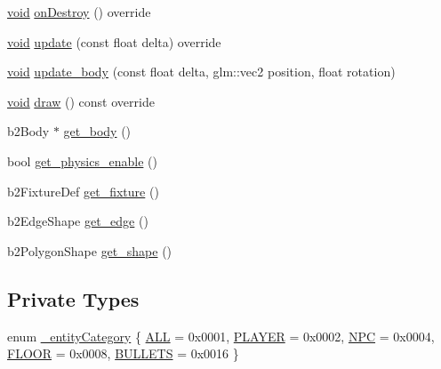 \begin{DoxyCompactItemize}
\hyperlink{imgui__impl__opengl3__loader_8h_ac668e7cffd9e2e9cfee428b9b2f34fa7}{void} \hyperlink{classPhysicsComponent_a5a5e472f0c6975d4a22e0990c504ec0a}{on\+Destroy} () override
\item 
\hyperlink{imgui__impl__opengl3__loader_8h_ac668e7cffd9e2e9cfee428b9b2f34fa7}{void} \hyperlink{classPhysicsComponent_a7494b2fec675132ee3e31050d7d87d30}{update} (const float delta) override
\item 
\hyperlink{imgui__impl__opengl3__loader_8h_ac668e7cffd9e2e9cfee428b9b2f34fa7}{void} \hyperlink{classPhysicsComponent_abbbd38f9a42a3fa09d42535b389e5b41}{update\+\_\+body} (const float delta, glm\+::vec2 position, float rotation)
\item 
\hyperlink{imgui__impl__opengl3__loader_8h_ac668e7cffd9e2e9cfee428b9b2f34fa7}{void} \hyperlink{classPhysicsComponent_afe1f99cac34411e9de43abebfcef0713}{draw} () const override
\item 
b2\+Body $\ast$ \hyperlink{classPhysicsComponent_af8a05389feadfe76f83ae492f20d4644}{get\+\_\+body} ()
\item 
bool \hyperlink{classPhysicsComponent_a54c20910dbe35ec46aa3e214f4503a89}{get\+\_\+physics\+\_\+enable} ()
\item 
b2\+Fixture\+Def \hyperlink{classPhysicsComponent_a63f0b8f93b3963c2225a7a75b63e4239}{get\+\_\+fixture} ()
\item 
b2\+Edge\+Shape \hyperlink{classPhysicsComponent_a0e5d7016877eb7a4e2d99367c3da7c9c}{get\+\_\+edge} ()
\item 
b2\+Polygon\+Shape \hyperlink{classPhysicsComponent_aeb345cab02629f9c74bd59a9257885a5}{get\+\_\+shape} ()
\end{DoxyCompactItemize}
\subsection*{Private Types}
\begin{DoxyCompactItemize}
\item 
enum \hyperlink{classPhysicsComponent_aaa3041013e4b2841a99d2f97ba24786f}{\+\_\+entity\+Category} \{ \newline
\hyperlink{classPhysicsComponent_aaa3041013e4b2841a99d2f97ba24786fa3d238d353711783b9d5a3909df3a5552}{A\+LL} = 0x0001, 
\hyperlink{classPhysicsComponent_aaa3041013e4b2841a99d2f97ba24786fa8e8352e571279a84a37722888dac1235}{P\+L\+A\+Y\+ER} = 0x0002, 
\hyperlink{classPhysicsComponent_aaa3041013e4b2841a99d2f97ba24786fac34a05d1913fd69180c20503c9c65734}{N\+PC} = 0x0004, 
\hyperlink{classPhysicsComponent_aaa3041013e4b2841a99d2f97ba24786fa56b565a12f51fa158e99e20df9015953}{F\+L\+O\+OR} = 0x0008, 
\newline
\hyperlink{classPhysicsComponent_aaa3041013e4b2841a99d2f97ba24786fa9fa0bbfeda36da22e9c5b4c0f0100f1b}{B\+U\+L\+L\+E\+TS} = 0x0016
 \}
\end{DoxyCompactItemize}

